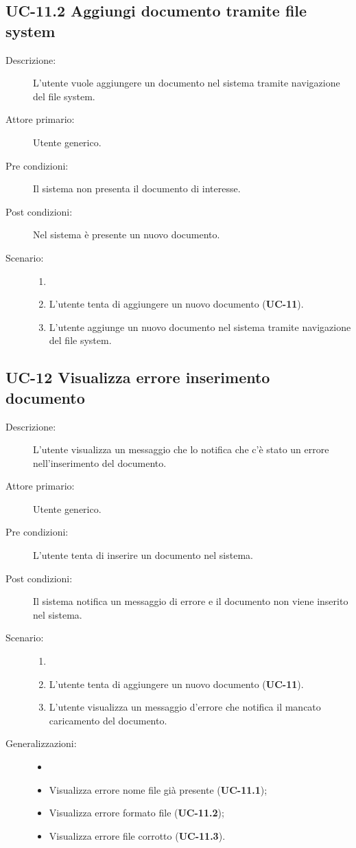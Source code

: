 \subsection{UC-11.2 Aggiungi documento tramite file system}
\begin{description}
    \item[Descrizione:] L'utente vuole aggiungere un documento nel sistema tramite navigazione del file system.
    \item[Attore primario:] Utente generico.
    \item[Pre condizioni:] Il sistema non presenta il documento di interesse.
    \item[Post condizioni:] Nel sistema è presente un nuovo documento.
    \item[Scenario:]
    \begin{enumerate}
        \item[]
        \item L’utente tenta di aggiungere un nuovo documento (\textbf{UC-11}).
        \item L'utente aggiunge un nuovo documento nel sistema tramite navigazione del file system.
    \end{enumerate}
\end{description}

\subsection{UC-12 Visualizza errore inserimento documento}
\begin{description}
    \item[Descrizione:] L'utente visualizza un messaggio che lo notifica che c'è stato un errore nell'inserimento del documento.
    \item[Attore primario:] Utente generico.
    \item[Pre condizioni:] L'utente tenta di inserire un documento nel sistema.
    \item[Post condizioni:] Il sistema notifica un messaggio di errore e il documento non viene inserito nel sistema.
    \item[Scenario:]
    \begin{enumerate}
        \item[]
        \item L’utente tenta di aggiungere un nuovo documento (\textbf{UC-11}).
        \item L'utente visualizza un messaggio d'errore che  notifica il mancato caricamento del documento. 
    \end{enumerate}
    \item[Generalizzazioni:]
    \begin{itemize}
        \item[] 
        \item Visualizza errore nome file già presente (\textbf{UC-11.1});
        \item Visualizza errore formato file (\textbf{UC-11.2});
        \item Visualizza errore file corrotto (\textbf{UC-11.3}).
    \end{itemize}
\end{description}

